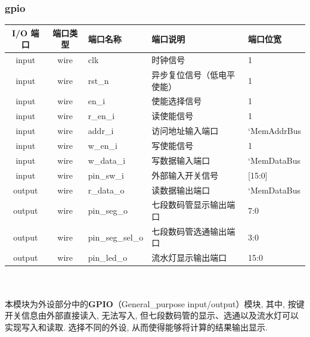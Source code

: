 \documentclass[lang=cn,11pt,a4paper,chinesefont=founder]{elegantpaper}
\begin{document}
\subsubsection{gpio}
\begin{tabular}{cclll}
    \toprule
    I/O 端口 & 端口类型 & 端口名称         & 端口说明                   & 端口位宽    \\
    \midrule
    input    & wire     & clk              & 时钟信号                   & 1           \\
    input    & wire     & rst\_n           & 异步复位信号（低电平使能） & 1           \\
    input    & wire     & en\_i            & 使能选择信号               & 1           \\

    input    & wire     & r\_en\_i         & 读使能信号                 & 1           \\
    input    & wire     & addr\_i          & 访问地址输入端口           & `MemAddrBus \\
    input    & wire     & w\_en\_i         & 写使能信号                 & 1           \\
    input    & wire     & w\_data\_i       & 写数据输入端口             & `MemDataBus \\
    input    & wire     & pin\_sw\_i       & 外部输入开关信号           & [15:0]      \\

    output   & wire     & r\_data\_o       & 读数据输出端口             & `MemDataBus \\
    output   & wire     & pin\_seg\_o      & 七段数码管显示输出端口     & 7:0         \\
    output   & wire     & pin\_seg\_sel\_o & 七段数码管选通输出端口     & 3:0         \\
    output   & wire     & pin\_led\_o      & 流水灯显示输出端口         & 15:0        \\
    \bottomrule
\end{tabular}\\
\\
本模块为外设部分中的\textbf{GPIO}（General\_purpose input/output）模块, 其中, 按键开关信息由外部直接读入, 无法写入, 但七段数码管的显示、选通以及流水灯可以实现写入和读取. 选择不同的外设, 从而使得能够将计算的结果输出显示. 
\end{document}
